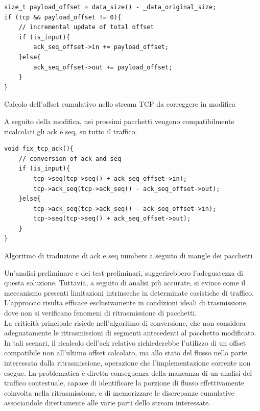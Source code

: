 \begin{listing}[H]
\begin{verbatim}
size_t payload_offset = data_size() - _data_original_size;
if (tcp && payload_offset != 0){
    // incremental update of total offset
    if (is_input){
        ack_seq_offset->in += payload_offset;
    }else{
        ack_seq_offset->out += payload_offset;
    }
}
\end{verbatim}
\caption{Calcolo dell'offset cumulativo nello stream TCP da correggere in modifica}\label{lst:tcp_ack_seq_transl}
\end{listing}
A seguito della modifica, nei prossimi pacchetti vengono compatibilmente ricalcolati gli \gls{ack} e \gls{seq}, su tutto il traffico.
\begin{listing}[H]
\begin{verbatim}
void fix_tcp_ack(){
    // conversion of ack and seq
    if (is_input){
        tcp->seq(tcp->seq() + ack_seq_offset->in);
        tcp->ack_seq(tcp->ack_seq() - ack_seq_offset->out);
    }else{
        tcp->ack_seq(tcp->ack_seq() - ack_seq_offset->in);
        tcp->seq(tcp->seq() + ack_seq_offset->out);
    }
}
\end{verbatim}
\caption{Algoritmo di traduzione di \gls{ack} e \gls{seq} numbers a seguito di mangle dei pacchetti}\label{lst:tcp_ack_seq_transl_fixing}
\end{listing}
Un'analisi preliminare e dei test preliminari, suggerirebbero l'adeguatezza di questa soluzione. Tuttavia, a seguito di analisi più accurate, si evince come il meccanismo presenti limitazioni intrinseche in determinate casistiche di traffico. L'approccio risulta efficace esclusivamente in condizioni ideali di trasmissione, dove non si verificano fenomeni di ritrasmissione di pacchetti.\\
La criticità principale risiede nell'algoritmo di conversione, che non considera adeguatamente le ritrasmissioni di segmenti antecedenti al pacchetto modificato. In tali scenari, il ricalcolo dell'\gls{ack} relativo richiederebbe l'utilizzo di un offset compatibile non all'ultimo offset calcolato, ma allo stato del flusso nella parte interessata dalla ritrasmissione, operazione che l'implementazione corrente non esegue. La problematica è diretta conseguenza della mancanza di un analisi del traffico contestuale, capace di identificare la porzione di flusso effettivamente coinvolta nella ritrasmissione, e di memorizzare le discrepanze cumulative associandole direttamente alle varie parti dello stream interessate.
